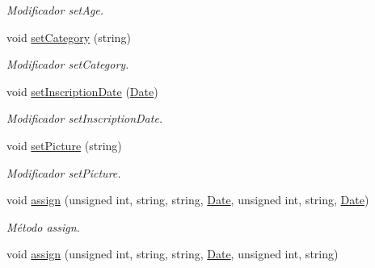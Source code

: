 \begin{DoxyCompactItemize}
\begin{DoxyCompactList}\small\item\em Modificador set\+Age. \end{DoxyCompactList}\item 
void \hyperlink{class_participant_af91cf9adf356fa0f0c0cf8c9fe76a294}{set\+Category} (string)\hypertarget{class_participant_af91cf9adf356fa0f0c0cf8c9fe76a294}{}\label{class_participant_af91cf9adf356fa0f0c0cf8c9fe76a294}

\begin{DoxyCompactList}\small\item\em Modificador set\+Category. \end{DoxyCompactList}\item 
void \hyperlink{class_participant_ab8b20c06f6ef4f9a93c3a0eb4aa486f6}{set\+Inscription\+Date} (\hyperlink{class_date}{Date})\hypertarget{class_participant_ab8b20c06f6ef4f9a93c3a0eb4aa486f6}{}\label{class_participant_ab8b20c06f6ef4f9a93c3a0eb4aa486f6}

\begin{DoxyCompactList}\small\item\em Modificador set\+Inscription\+Date. \end{DoxyCompactList}\item 
void \hyperlink{class_participant_a8ed3db539a1ab6c04b110968347f45fb}{set\+Picture} (string)\hypertarget{class_participant_a8ed3db539a1ab6c04b110968347f45fb}{}\label{class_participant_a8ed3db539a1ab6c04b110968347f45fb}

\begin{DoxyCompactList}\small\item\em Modificador set\+Picture. \end{DoxyCompactList}\item 
void \hyperlink{class_participant_a01733de15f5f3eeeb7b26623975abc16}{assign} (unsigned int, string, string, \hyperlink{class_date}{Date}, unsigned int, string, \hyperlink{class_date}{Date})\hypertarget{class_participant_a01733de15f5f3eeeb7b26623975abc16}{}\label{class_participant_a01733de15f5f3eeeb7b26623975abc16}

\begin{DoxyCompactList}\small\item\em Método assign. \end{DoxyCompactList}\item 
void \hyperlink{class_participant_ac3f45c1b5abff2650e52cde964f6ab94}{assign} (unsigned int, string, string, \hyperlink{class_date}{Date}, unsigned int, string)\hypertarget{class_participant_ac3f45c1b5abff2650e52cde964f6ab94}{}\label{class_participant_ac3f45c1b5abff2650e52cde964f6ab94}


\end{DoxyCompactItemize}
